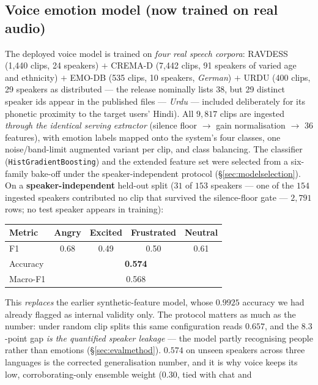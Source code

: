 \documentclass[11pt,a4paper]{article}
\begin{document}
\subsection{Voice emotion model (now trained on real audio)}
\label{sec:voiceresults}
The deployed voice model is trained on \emph{four real speech corpora}: RAVDESS
(1{,}440 clips, 24 speakers) $+$ CREMA-D (7{,}442 clips, 91 speakers of varied age
and ethnicity) $+$ EMO-DB (535 clips, 10 speakers, \emph{German}) $+$ URDU (400
clips, 29 speakers as distributed --- the release nominally lists 38, but 29
distinct speaker ids appear in the published files --- \emph{Urdu} --- included deliberately for its phonetic proximity
to the target users' Hindi). All $9{,}817$ clips are ingested \emph{through the
identical serving extractor} (silence floor $\rightarrow$ gain normalisation
$\rightarrow$ 36 features), with emotion labels mapped onto the system's four
classes, one noise/band-limit augmented variant per clip, and class balancing.
The classifier (\texttt{HistGradientBoosting}) and the extended feature set were
selected from a six-family bake-off under the speaker-independent protocol
(\S\ref{sec:modelselection}). On a \textbf{speaker-independent} held-out split
($31$ of $153$ speakers --- one of the $154$ ingested speakers contributed no clip
that survived the silence-floor gate --- $2{,}791$ rows; no test speaker appears in
training):
\begin{center}
\begin{tabular}{lcccc}
\toprule
\textbf{Metric} & \textbf{Angry} & \textbf{Excited} & \textbf{Frustrated} & \textbf{Neutral} \\
\midrule
F1 & 0.68 & 0.49 & 0.50 & 0.61 \\
\midrule
Accuracy & \multicolumn{4}{c}{\textbf{0.574}} \quad (chance $= 0.25$) \\
Macro-F1 & \multicolumn{4}{c}{0.568} \\
\bottomrule
\end{tabular}
\end{center}
This \emph{replaces} the earlier synthetic-feature model, whose $0.9925$ accuracy we
had already flagged as internal validity only. The protocol matters as much as the
number: under random clip splits this same configuration reads $0.657$, and the
$8.3$-point gap \emph{is the quantified speaker leakage} --- the model partly
recognising people rather than emotions (\S\ref{sec:evalmethod}). $0.574$ on unseen
speakers across three languages is the corrected generalisation number, and it is why
voice keeps its low, corroborating-only ensemble weight ($0.30$, tied with chat and
\end{document}
